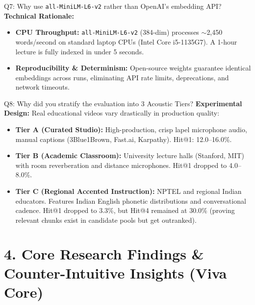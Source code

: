 \documentclass[10pt,a4paper]{article}
\begin{document}
\begin{quesbox}{Q7: Why use \texttt{all-MiniLM-L6-v2} rather than OpenAI's embedding API?}
\textbf{Technical Rationale:}
\begin{itemize}[leftmargin=*]
    \item \textbf{CPU Throughput:} \texttt{all-MiniLM-L6-v2} (384-dim) processes $\sim$2,450 words/second on standard laptop CPUs (Intel Core i5-1135G7). A 1-hour lecture is fully indexed in under 5 seconds.
    \item \textbf{Reproducibility \& Determinism:} Open-source weights guarantee identical embeddings across runs, eliminating API rate limits, deprecations, and network timeouts.
\end{itemize}
\end{quesbox}

\begin{quesbox}{Q8: Why did you stratify the evaluation into 3 Acoustic Tiers?}
\textbf{Experimental Design:} Real educational videos vary drastically in production quality:
\begin{itemize}[leftmargin=*]
    \item \textbf{Tier A (Curated Studio):} High-production, crisp lapel microphone audio, manual captions (3Blue1Brown, Fast.ai, Karpathy). Hit@1: 12.0--16.0\%.
    \item \textbf{Tier B (Academic Classroom):} University lecture halls (Stanford, MIT) with room reverberation and distance microphones. Hit@1 dropped to 4.0--8.0\%.
    \item \textbf{Tier C (Regional Accented Instruction):} NPTEL and regional Indian educators. Features Indian English phonetic distributions and conversational cadence. Hit@1 dropped to 3.3\%, but Hit@4 remained at 30.0\% (proving relevant chunks exist in candidate pools but get outranked).
\end{itemize}
\end{quesbox}

\section*{\color{primary} 4. Core Research Findings \& Counter-Intuitive Insights (Viva Core)}
\end{document}
